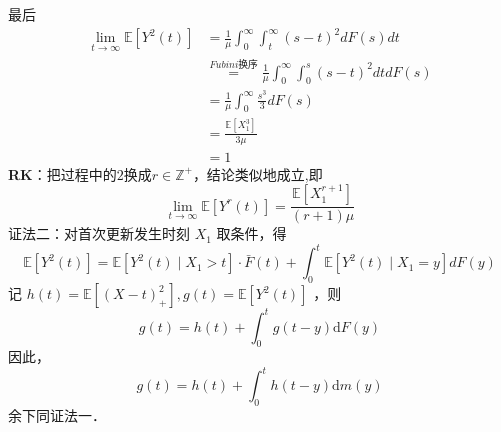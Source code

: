 \documentclass[UTF8,openany]{book}
\begin{document}
最后
\begin{align*}
	\lim _{t \rightarrow \infty} {\mathbb{E}}\left[Y^{2}(t)\right]&=\frac{1}{\mu}\int_{0}^{\infty} \int_{t}^{\infty} (s-t)^2dF(s)dt\\
	& \stackrel{Fubini\text{换序}}{=}\frac{1}{\mu}\int_{0}^{\infty} \int_{0}^{s} (s-t)^2dtdF(s)\\
	& =\frac{1}{\mu} \int_{0}^{\infty} \frac{s^3}{3}dF(s)\\
	&=\frac{\mathbb{E}\left[X_1^3  \right]}{3\mu}\\
	&=1
\end{align*}
\textbf{RK}：把过程中的$2$换成$r\in \mathbb{Z}^+$，结论类似地成立,即\\
$$
\lim _{t \rightarrow \infty} {\mathbb{E}}\left[Y^{r}(t)\right]=\frac{\mathbb{E}\left[X_1^{r+1} \right]}{(r+1)\mu}
$$
证法二：对首次更新发生时刻 $X_{1}$ 取条件，得
$$
\mathbb{E}\left[Y^{2}(t)\right]=\mathbb{E}\left[Y^{2}(t) \mid X_{1}>t\right] \cdot \bar{F}(t)+\int_{0}^{t} \mathbb{E}\left[Y^{2}(t) \mid X_{1}=y\right] d F(y)
$$
记 $h(t)=\mathbb{E}\left[(X-t)_{+}^{2}\right], g(t)=\mathbb{E}\left[Y^{2}(t)\right]$ ，则
$$
g(t)=h(t)+\int_{0}^{t} g(t-y) \mathrm{d} F(y)
$$
因此，
$$
g(t)=h(t)+\int_{0}^{t} h(t-y) \mathrm{d} m(y)
$$
余下同证法一．\\
\end{document}
